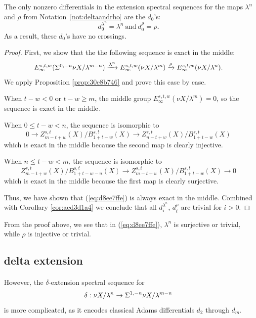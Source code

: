 \documentclass[12pt]{amsart}
\numberwithin{equation}{section}
\begin{document}
\begin{proposition}\label{prop:9770ae6e}
The only nonzero differentials in the extension spectral sequences for the maps $\lambda^n$ and $\rho$ from Notation~\ref{not:deltaandrho} are the $d_0$'s:
$$d^{\lambda^n}_0=\lambda^n \ \text{and} \ d^{\rho}_0=\rho.$$
As a result, these $d_0$'s have no crossings.
\end{proposition}
\begin{proof}
    First, we show that the the following sequence is exact in the middle:
    \begin{equation}\label{eq:d8ee7ffe}
        \scalebox{1}{$E_\infty^{s,t,w}(\Sus^{0,-n}\nu X/\lambda^{m-n})\fto{\lambda^n} E_\infty^{s,t,w}(\nu X/\lambda^{m})\fto{\rho} E_\infty^{s,t,w}(\nu X/\lambda^{n})$}.
    \end{equation}
    We apply Proposition \ref{prop:30e8b746} and prove this case by case.

    When $t-w<0$ or $t-w\ge m$, the middle group $E_\infty^{s,t,w}(\nu X/\lambda^{m}) = 0$, so the sequence is exact in the middle.

    When $0\le t-w<n$, the sequence is isomorphic to
    $$0\to Z^{s,t}_{m-t+w}(X)/B^{s,t}_{1+t-w}(X)\to Z^{s,t}_{n-t+w}(X)/B^{s,t}_{1+t-w}(X)$$
    which is exact in the middle because the second map is clearly injective.

    When $n\le t-w<m$, the sequence is isomorphic to
    $$Z^{s,t}_{m-t+w}(X)/B^{s,t}_{1+t-w-n}(X)\to Z^{s,t}_{m-t+w}(X)/B^{s,t}_{1+t-w}(X)\to 0$$
    which is exact in the middle because the first map is clearly surjective.

    Thus, we have shown that (\ref{eq:d8ee7ffe}) is always exact in the middle. Combined with Corollary \ref{cor:aed3d1a4} we conclude that all $d^{\lambda^n}_i$, $d^{\rho}_i$ are trivial for $i>0$.
\end{proof}

\begin{remark}
    From the proof above, we see that in (\ref{eq:d8ee7ffe}), $\lambda^n$ is surjective or trivial, while $\rho$ is injective or trivial.
\end{remark}

\subsection{delta extension}

\paragraph{}
However, the $\delta$-extension spectral sequence for
$$\delta:\nu X/\lambda^n\to \Sigma^{1,-n}\nu X/\lambda^{m-n}$$
is more complicated, as it encodes classical Adams differentials $d_2$ through $d_m$.
\end{document}
